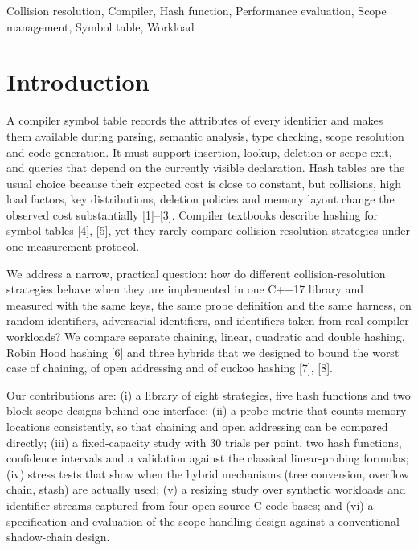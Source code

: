 \documentclass{ieeeaccess}
\begin{document}
\begin{keywords}
Collision resolution, Compiler, Hash function, Performance evaluation, Scope management, Symbol table, Workload
\end{keywords}

\titlepgskip=-15pt

\maketitle

\section{Introduction}

A compiler symbol table records the attributes of every identifier and makes them available during parsing, semantic analysis, type checking, scope resolution and code generation. It must support insertion, lookup, deletion or scope exit, and queries that depend on the currently visible declaration. Hash tables are the usual choice because their expected cost is close to constant, but collisions, high load factors, key distributions, deletion policies and memory layout change the observed cost substantially [1]--[3]. Compiler textbooks describe hashing for symbol tables [4], [5], yet they rarely compare collision-resolution strategies under one measurement protocol.

We address a narrow, practical question: how do different collision-resolution strategies behave when they are implemented in one C++17 library and measured with the same keys, the same probe definition and the same harness, on random identifiers, adversarial identifiers, and identifiers taken from real compiler workloads? We compare separate chaining, linear, quadratic and double hashing, Robin Hood hashing [6] and three hybrids that we designed to bound the worst case of chaining, of open addressing and of cuckoo hashing [7], [8].

Our contributions are: (i) a library of eight strategies, five hash functions and two block-scope designs behind one interface; (ii) a probe metric that counts memory locations consistently, so that chaining and open addressing can be compared directly; (iii) a fixed-capacity study with 30 trials per point, two hash functions, confidence intervals and a validation against the classical linear-probing formulas; (iv) stress tests that show when the hybrid mechanisms (tree conversion, overflow chain, stash) are actually used; (v) a resizing study over synthetic workloads and identifier streams captured from four open-source C code bases; and (vi) a specification and evaluation of the scope-handling design against a conventional shadow-chain design.
\end{document}
